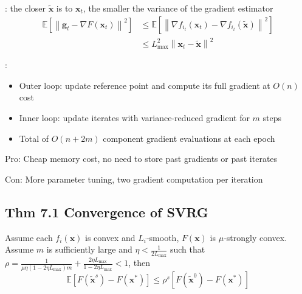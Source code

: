 

: the closer $\tilde{\mathbf{x}}$ is to $\mathbf{x}_{t}$, the smaller the variance of the gradient estimator
$$
\begin{aligned}
\mathbb{E}\left[\left\|\mathbf{g}_{t}-\nabla F\left(\mathbf{x}_{t}\right)\right\|^{2}\right] &\leq \mathbb{E}\left[\left\|\nabla f_{i_{t}}\left(\mathbf{x}_{t}\right)-\nabla f_{i_{t}}(\tilde{\mathbf{x}})\right\|^{2}\right]\\
&\leq L_{\max }^{2}\left\|\mathbf{x}_{t}-\tilde{\mathbf{x}}\right\|^{2}
\end{aligned}
$$

:
\begin{itemize}[leftmargin=*]
    \item Outer loop: update reference point and compute its full gradient at $O(n)$ cost
    \item Inner loop: update iterates with variance-reduced gradient for $m$ steps
    \item Total of $O(n+2 m)$ component gradient evaluations at each epoch
\end{itemize}


Pro: Cheap memory cost, no need to store past gradients or past iterates

Con: More parameter tuning, two gradient computation per iteration









\subsection*{Thm 7.1 Convergence of SVRG}
Assume each $f_{i}(\mathbf{x})$ is convex and $L_{i}$-smooth, $F(\mathbf{x})$ is $\mu$-strongly convex. Assume $m$ is sufficiently large and $\eta<\frac{1}{2 L_{\max }}$ such that $\rho=\frac{1}{\mu \eta\left(1-2 \eta L_{\max }\right) m}+\frac{2 \eta L_{\max }}{1-2 \eta L_{\max }}<1$, then
$$
\mathbb{E}\left[F\left(\tilde{\mathbf{x}}^{s}\right)-F\left(\mathbf{x}^{*}\right)\right] \leq \rho^{s}\left[F\left(\tilde{\mathbf{x}}^{0}\right)-F\left(\mathbf{x}^{*}\right)\right]
$$

